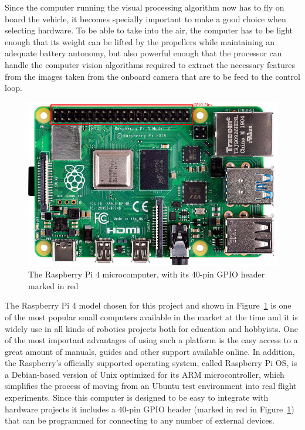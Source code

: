 Since the computer running the visual processing algorithm now has to fly on board the vehicle, it becomes specially important to make a good choice when selecting hardware.
To be able to take into the air, the computer has to be light enough that its weight can be lifted by the propellers while maintaining an adequate battery autonomy, but also powerful enough that the processor can handle the computer vision algorithms required to extract the necessary features from the images taken from the onboard camera that are to be feed to the control loop.

\begin{figure}
  \centering
  \includegraphics[width=\textwidth,keepaspectratio]{img/rpi4.png}
  \caption{The Raspberry Pi 4 microcomputer, with its 40-pin GPIO header marked in red}\label{fig:rpi4}
\end{figure}
The Raspberry Pi 4 model chosen for this project and shown in Figure~\ref{fig:rpi4} is one of the most popular small computers available in the market at the time and it is widely use in all kinds of robotics projects both for education and hobbyists.
One of the most important advantages of using such a platform is the easy access to a great amount of manuals, guides and other support available online.
In addition, the Raspberry's officially supported operating system, called Raspberry Pi OS, is a Debian-based version of Unix optimized for its ARM microcontroller, which simplifies the process of moving from an Ubuntu test environment into real flight experiments.
Since this computer is designed to be easy to integrate with hardware projects it includes a 40-pin GPIO header (marked in red in Figure~\ref{fig:rpi4}) that can be programmed for connecting to any number of external devices.

